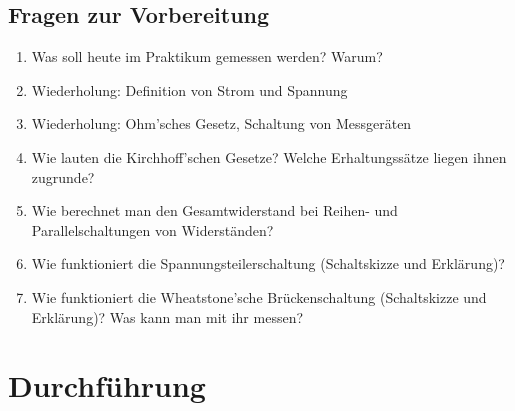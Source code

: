 \begin{tutorhint}
\section{Fragen zur Vorbereitung}

\begin{enumerate}
 \item Was soll heute im Praktikum gemessen werden? Warum?
 \item Wiederholung: Definition von Strom und Spannung
 \item Wiederholung: Ohm'sches Gesetz, Schaltung von Messgeräten
 \item Wie lauten die Kirchhoff'schen Gesetze? Welche Erhaltungssätze liegen ihnen zugrunde?
 \item Wie berechnet man den Gesamtwiderstand bei Reihen- und Parallelschaltungen von Widerständen?
 \item Wie funktioniert die Spannungsteilerschaltung (Schaltskizze und Erklärung)?
 \item Wie funktioniert die Wheatstone'sche Brückenschaltung (Schaltskizze und Erklärung)? Was kann man mit ihr messen?
\end{enumerate}
\end{tutorhint}

\section{Durchführung} 

